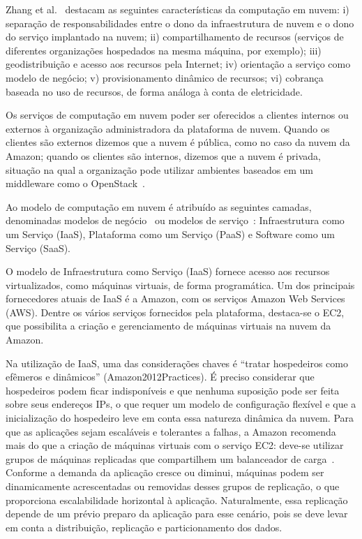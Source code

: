 Zhang et al.~\cite{Zhang2010Cloud} destacam as seguintes características da computação em nuvem: i) separação de responsabilidades entre o dono da infraestrutura de nuvem e o dono do serviço implantado na nuvem; ii) compartilhamento de recursos (serviços de diferentes organizações hospedados na mesma máquina, por exemplo); iii) geodistribuição e acesso aos recursos pela Internet; iv) orientação a serviço como modelo de negócio; v) provisionamento dinâmico de recursos; vi) cobrança baseada no uso de recursos, de forma análoga à conta de eletricidade.

Os serviços de computação em nuvem poder ser oferecidos a clientes internos ou externos à organização administradora da plataforma de nuvem. Quando os clientes são externos dizemos que a nuvem é pública, como no caso da nuvem da Amazon; quando os clientes são internos, dizemos que a nuvem é privada, situação na qual a organização pode utilizar ambientes baseados em um middleware como o OpenStack~\cite{Zhang2010Cloud}.

Ao modelo de computação em nuvem é atribuído as seguintes camadas, denominadas modelos de negócio~\cite{Zhang2010Cloud} ou modelos de serviço~\cite{Nist2011Cloud}: Infraestrutura como um Serviço (IaaS), Plataforma como um Serviço (PaaS) e Software como um Serviço (SaaS). 

O modelo de Infraestrutura como Serviço (IaaS) fornece acesso aos recursos virtualizados, como máquinas virtuais, de forma programática. Um dos principais fornecedores atuais de IaaS é a Amazon, com os serviços Amazon Web Services (AWS). Dentre os vários serviços fornecidos pela plataforma, destaca-se o EC2, que possibilita a criação e gerenciamento de máquinas virtuais na nuvem da Amazon.

Na utilização de IaaS, uma das considerações chaves é ``tratar hospedeiros como efêmeros e dinâmicos'' (Amazon2012Practices). É preciso considerar que hospedeiros podem ficar indisponíveis e que nenhuma suposição pode ser feita sobre seus endereços IPs, o que requer um modelo de configuração flexível e que a inicialização do hospedeiro leve em conta essa natureza dinâmica da nuvem. Para que as aplicações sejam escaláveis e tolerantes a falhas, a Amazon recomenda mais do que a criação de máquinas virtuais com o serviço EC2: deve-se utilizar grupos de máquinas replicadas que compartilhem um balanceador de carga~\cite{Amazon2012Practices}. Conforme a demanda da aplicação cresce ou diminui, máquinas podem ser dinamicamente acrescentadas ou removidas desses grupos de replicação, o que proporciona escalabilidade horizontal à aplicação. Naturalmente, essa replicação depende de um prévio preparo da aplicação para esse cenário, pois se deve levar em conta a distribuição, replicação e particionamento dos dados. 


